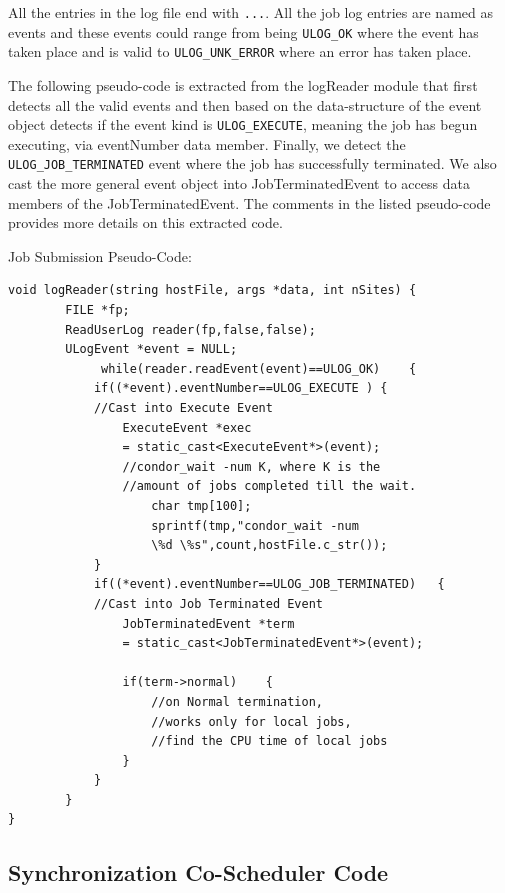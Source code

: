 \documentclass[ms,electronic,double]{nuthesis}
\begin{document}
All the entries in the log file end with \texttt{...}. All the job 
log entries are named as events and these events could range from being  \texttt{ULOG\_OK} where 
the event has taken place and is valid to \texttt{ULOG\_UNK\_ERROR} where an error has 
taken place.

The following pseudo-code is extracted from the logReader module that first 
detects all the valid events and then based on the data-structure of the event 
object detects if the event kind is \texttt{ULOG\_EXECUTE}, meaning the job has begun 
executing, via eventNumber data member. Finally, we detect the \texttt{ULOG\_JOB\_TERMINATED} 
event where the job has successfully terminated. We also cast the more general event 
object into JobTerminatedEvent to access data members of the 
JobTerminatedEvent. The comments in the listed pseudo-code provides more details 
on this extracted code.


Job Submission Pseudo-Code:

\begin{lstlisting}
void logReader(string hostFile, args *data, int nSites)	{		
		FILE *fp;
		ReadUserLog reader(fp,false,false);
		ULogEvent *event = NULL;		
             while(reader.readEvent(event)==ULOG_OK)	{                    
            if((*event).eventNumber==ULOG_EXECUTE )	{                                
            //Cast into Execute Event
                ExecuteEvent *exec 
                = static_cast<ExecuteEvent*>(event);                                       
                //condor_wait -num K, where K is the 
                //amount of jobs completed till the wait.
                    char tmp[100];
                    sprintf(tmp,"condor_wait -num 
                    \%d \%s",count,hostFile.c_str());
            }            
            if((*event).eventNumber==ULOG_JOB_TERMINATED)	{                
            //Cast into Job Terminated Event
                JobTerminatedEvent *term 
                = static_cast<JobTerminatedEvent*>(event);                
                
                if(term->normal)	{                    
                    //on Normal termination, 
                    //works only for local jobs, 
                    //find the CPU time of local jobs
                }               
            }
        }
}

\end{lstlisting}
\subsection{Synchronization Co-Scheduler Code}
\end{document}
